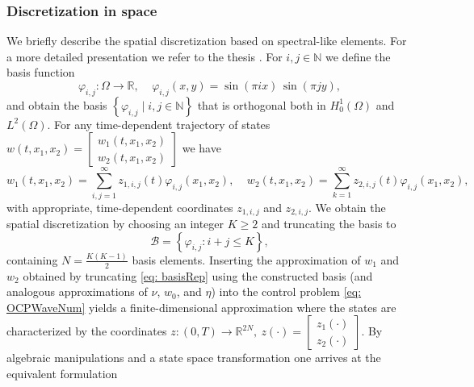 \documentclass[11pt,reqno]{amsart}
\numberwithin{equation}{section}
\theoremstyle{plain}
\begin{document}
%
\subsubsection{Discretization in space}\label{subs: discretization in space}
%
We briefly describe the spatial discretization based on spectral-like elements. For a more detailed presentation we refer to the thesis \cite{Schr25}.
For $i,j \in \mathbb{N}$ we define the basis function
%
\begin{equation*}
	\varphi_{i,j} \colon \Omega \rightarrow \mathbb{R},
	~~~~~ \varphi_{i,j}(x,y) = \sin(\pi i x ) \, \sin(\pi j y ),
\end{equation*}
%
and obtain the basis $\left\{ \varphi_{i,j} \mid i,j \in \mathbb{N} \right\}$ that is orthogonal both in $H^1_0(\Omega)$ and $L^2(\Omega)$.
%
For any time-dependent trajectory of states $w(t,x_1,x_2) = \begin{bmatrix} w_1(t,x_1,x_2) \\ w_2(t,x_1,x_2) \end{bmatrix}$ we have
%
\begin{equation}\label{eq: basisRep}
	w_1(t,x_1,x_2) = \sum_{i,j = 1}^\infty z_{1,i,j}(t) \varphi_{i,j}(x_1,x_2),
	~~~~~
	w_2(t,x_1,x_2) = \sum_{k = 1}^\infty z_{2,i,j}(t) \varphi_{i,j}(x_1,x_2),
\end{equation}
%
with appropriate, time-dependent coordinates $ z_{1,i,j}$ and $ z_{2,i,j}$. We obtain the spatial discretization by choosing an integer $K \geq 2$ and truncating the basis to
%
\begin{equation*}
	\mathcal{B} = \left\{ \varphi_{i,j} \colon i + j \leq K \right\},
\end{equation*}
%
containing $N=\frac{K(K-1)}{2}$ basis elements.
Inserting the approximation of $w_1$ and $w_2$ obtained by truncating \eqref{eq: basisRep} using the constructed basis (and analogous approximations of $\nu$, $w_0$, and $\eta$) into the control problem \eqref{eq: OCPWaveNum} yields a finite-dimensional approximation where the states are characterized by the coordinates $z \colon (0,T) \rightarrow \mathbb{R}^{2N},~ z(\cdot) = \begin{bmatrix} z_1(\cdot) \\ z_2(\cdot) \end{bmatrix}$.
%
By algebraic manipulations and a state space transformation one arrives at the equivalent formulation
\end{document}

